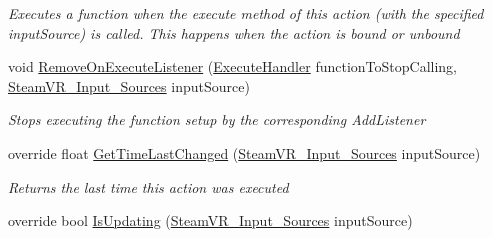 \begin{DoxyCompactItemize}
\begin{DoxyCompactList}\small\item\em Executes a function when the execute method of this action (with the specified input\+Source) is called. This happens when the action is bound or unbound \end{DoxyCompactList}\item 
void \mbox{\hyperlink{class_valve_1_1_v_r_1_1_steam_v_r___action___vibration_a93047e7c0b65262fdab01a25dae48d52}{Remove\+On\+Execute\+Listener}} (\mbox{\hyperlink{class_valve_1_1_v_r_1_1_steam_v_r___action___vibration_ac075e9e8f3e9eea89be32c403e6f86d5}{Execute\+Handler}} function\+To\+Stop\+Calling, \mbox{\hyperlink{namespace_valve_1_1_v_r_a82e5bf501cc3aa155444ee3f0662853f}{Steam\+V\+R\+\_\+\+Input\+\_\+\+Sources}} input\+Source)
\begin{DoxyCompactList}\small\item\em Stops executing the function setup by the corresponding Add\+Listener \end{DoxyCompactList}\item 
override float \mbox{\hyperlink{class_valve_1_1_v_r_1_1_steam_v_r___action___vibration_ab4a746a1c972e2a301f82c326dbea34b}{Get\+Time\+Last\+Changed}} (\mbox{\hyperlink{namespace_valve_1_1_v_r_a82e5bf501cc3aa155444ee3f0662853f}{Steam\+V\+R\+\_\+\+Input\+\_\+\+Sources}} input\+Source)
\begin{DoxyCompactList}\small\item\em Returns the last time this action was executed \end{DoxyCompactList}\item 
override bool \mbox{\hyperlink{class_valve_1_1_v_r_1_1_steam_v_r___action___vibration_a1dd64911f3d1caa2b78123bd178b0f7b}{Is\+Updating}} (\mbox{\hyperlink{namespace_valve_1_1_v_r_a82e5bf501cc3aa155444ee3f0662853f}{Steam\+V\+R\+\_\+\+Input\+\_\+\+Sources}} input\+Source)
\end{DoxyCompactItemize}
